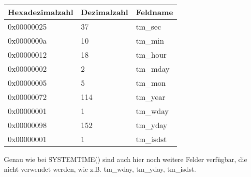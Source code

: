 \begin{center}
\begin{tabular}{ | l | l | l | }
\hline
\headercolor{} Hexadezimalzahl & 
\headercolor{} Dezimalzahl & 
\headercolor{} Feldname \\
\hline
0x00000025 & 37 	& tm\_sec \\
\hline
0x0000000a & 10 	& tm\_min \\
\hline
0x00000012 & 18 	& tm\_hour \\	
\hline
0x00000002 & 2 		& tm\_mday \\	
\hline
0x00000005 & 5 		& tm\_mon \\	
\hline
0x00000072 & 114 	& tm\_year \\
\hline
0x00000001 & 1 		& tm\_wday \\	
\hline
0x00000098 & 152 	& tm\_yday \\	
\hline
0x00000001 & 1 		& tm\_isdst \\
\hline
\end{tabular}
\end{center}
Genau wie bei SYSTEMTIME() sind auch hier noch weitere Felder verfügbar, die nicht verwendet
werden, wie z.B. tm\_wday, tm\_yday, tm\_isdst.
